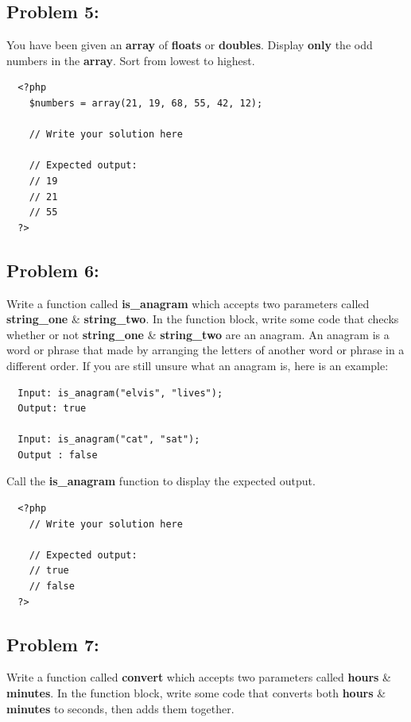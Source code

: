 \documentclass{article}
\begin{document}
\subsection*{Problem 5:}
You have been given an \textbf{array} of \textbf{floats} or \textbf{doubles}. Display \textbf{only} the odd numbers in the \textbf{array}. Sort from lowest to highest.

\begin{verbatim}
  <?php  
    $numbers = array(21, 19, 68, 55, 42, 12);
    
    // Write your solution here

    // Expected output:
    // 19
    // 21
    // 55
  ?>
\end{verbatim}

\subsection*{Problem 6:}
Write a function called \textbf{is\_anagram} which accepts two parameters called \textbf{string\_one} \& \textbf{string\_two}. In the function block, write some code that checks whether or not \textbf{string\_one} \& \textbf{string\_two} are an anagram. An anagram is a word or phrase that made by arranging the letters of another word or phrase in a different order. If you are still unsure what an anagram is, here is an example:

\begin{verbatim}
  Input: is_anagram("elvis", "lives");
  Output: true

  Input: is_anagram("cat", "sat");
  Output : false
\end{verbatim}

Call the \textbf{is\_anagram} function to display the expected output.

\begin{verbatim}
  <?php  
    // Write your solution here

    // Expected output:
    // true
    // false
  ?>
\end{verbatim}

\subsection*{Problem 7:}
Write a function called \textbf{convert} which accepts two parameters called \textbf{hours} \& \textbf{minutes}. In the function block, write some code that converts both \textbf{hours} \& \textbf{minutes} to seconds, then adds them together.
\end{document}
